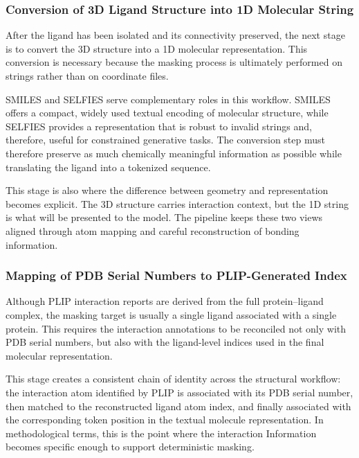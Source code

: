 \documentclass[a4paper,12pt]{article}
\begin{document}
\subsubsection{Conversion of 3D Ligand Structure into 1D Molecular String}

After the ligand has been isolated and its connectivity preserved, the next
stage is to convert the 3D structure into a 1D molecular representation. This
conversion is necessary because the masking process is ultimately performed on
strings rather than on coordinate files.

SMILES and SELFIES serve complementary roles in this workflow. SMILES offers a
compact, widely used textual encoding of molecular structure, while SELFIES
provides a representation that is robust to invalid strings and, therefore, useful
for constrained generative tasks. The conversion step must therefore preserve as 
much chemically meaningful information as possible while translating the ligand
into a tokenized sequence.

This stage is also where the difference between geometry and
representation becomes explicit. The 3D structure carries interaction
context, but the 1D string is what will be presented to the model. The pipeline
keeps these two views aligned through atom mapping and careful reconstruction
of bonding information.

\subsubsection{Mapping of PDB Serial Numbers to PLIP-Generated Index}

Although PLIP interaction reports are derived from the full protein--ligand
complex, the masking target is usually a single ligand associated with a single
protein. This requires the interaction annotations to be reconciled not only
with PDB serial numbers, but also with the ligand-level indices used in the
final molecular representation.

This stage creates a consistent chain of identity across the structural
workflow: the interaction atom identified by PLIP is associated with its PDB
serial number, then matched to the reconstructed ligand atom index, and finally
associated with the corresponding token position in the textual molecule
representation. In methodological terms, this is the point where the interaction
Information becomes specific enough to support deterministic masking.
\end{document}
